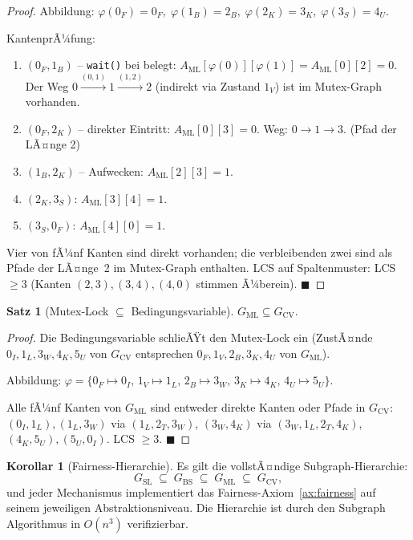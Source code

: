 ﻿\documentclass[a4paper,12pt]{article}
\theoremstyle{definition}
\newtheorem{satz}{Satz}
\newtheorem{korollar}{Korollar}
\begin{document}
\begin{proof}
Abbildung:
$\varphi(0_F) = 0_F,\;
 \varphi(1_B) = 2_B,\;
 \varphi(2_K) = 3_K,\;
 \varphi(3_S) = 4_U.$

KantenprÃ¼fung:
\begin{enumerate}
  \item $(0_F, 1_B)$ -- \texttt{wait()} bei belegt:
        $A_{\mathrm{ML}}[\varphi(0)][\varphi(1)] = A_{\mathrm{ML}}[0][2] = 0$.
        Der Weg $0 \xrightarrow{(0,1)} 1 \xrightarrow{(1,2)} 2$
        (indirekt via Zustand $1_V$) ist im Mutex-Graph vorhanden.
  \item $(0_F, 2_K)$ -- direkter Eintritt:
        $A_{\mathrm{ML}}[0][3] = 0$.
        Weg: $0 \xrightarrow{} 1 \xrightarrow{} 3$. \checkmark (Pfad der LÃ¤nge 2)
  \item $(1_B, 2_K)$ -- Aufwecken:
        $A_{\mathrm{ML}}[2][3] = 1$. \checkmark
  \item $(2_K, 3_S)$:
        $A_{\mathrm{ML}}[3][4] = 1$. \checkmark
  \item $(3_S, 0_F)$:
        $A_{\mathrm{ML}}[4][0] = 1$. \checkmark
\end{enumerate}

Vier von fÃ¼nf Kanten sind direkt vorhanden; die verbleibenden
zwei sind als Pfade der LÃ¤nge~2 im Mutex-Graph enthalten.
LCS auf Spaltenmuster: LCS $\geq 3$ (Kanten $(2,3), (3,4), (4,0)$
stimmen Ã¼berein).
\hfill$\blacksquare$
\end{proof}

\begin{satz}[Mutex-Lock $\subseteq$ Bedingungsvariable]
\label{satz:ml_cv}
$G_{\mathrm{ML}} \subseteq G_{\mathrm{CV}}$.
\end{satz}

\begin{proof}
Die Bedingungsvariable schlieÃŸt den Mutex-Lock ein (ZustÃ¤nde
$0_I, 1_L, 3_W, 4_K, 5_U$ von $G_{\mathrm{CV}}$ entsprechen
$0_F, 1_V, 2_B, 3_K, 4_U$ von $G_{\mathrm{ML}}$).

Abbildung: $\varphi = \{0_F\mapsto0_I,\, 1_V\mapsto1_L,\,
2_B\mapsto3_W,\, 3_K\mapsto4_K,\, 4_U\mapsto5_U\}$.

Alle fÃ¼nf Kanten von $G_{\mathrm{ML}}$ sind entweder direkte
Kanten oder Pfade in $G_{\mathrm{CV}}$:
$(0_I,1_L), (1_L,3_W)$ via $(1_L,2_T,3_W)$,
$(3_W,4_K)$ via $(3_W,1_L,2_T,4_K)$, $(4_K,5_U), (5_U,0_I)$.
LCS $\geq 3$.
\hfill$\blacksquare$
\end{proof}

\begin{korollar}[Fairness-Hierarchie]
\label{kor:hier}
Es gilt die vollstÃ¤ndige Subgraph-Hierarchie:
\[
  G_{\mathrm{SL}} \;\subseteq\;
  G_{\mathrm{BS}} \;\subseteq\;
  G_{\mathrm{ML}} \;\subseteq\;
  G_{\mathrm{CV}},
\]
und jeder Mechanismus implementiert das Fairness-Axiom~\ref{ax:fairness}
auf seinem jeweiligen Abstraktionsniveau.
Die Hierarchie ist durch den Subgraph Algorithmus in $O(n^3)$ verifizierbar.
\end{korollar}
\end{document}
